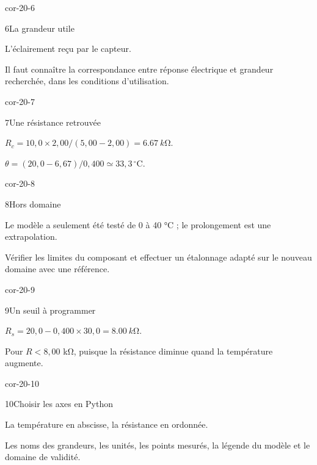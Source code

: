 \begin{blocLivre}{cor-20-6}\begin{corrige}{6}{La grandeur utile}
\begin{questions}
\item L’éclairement reçu par le capteur.
\item Il faut connaître la correspondance entre réponse électrique et grandeur recherchée, dans les conditions d’utilisation.
\end{questions}
\end{corrige}\end{blocLivre}
\begin{blocLivre}{cor-20-7}\begin{corrige}{7}{Une résistance retrouvée}
\begin{questions}
\item $R_c=10,0\times2,00/(5,00-2,00)=\qty{6,67}{k\ohm}$.
\item $\theta=(20,0-6,67)/0,400\simeq33,3\,^{\circ}\mathrm C$.
\end{questions}
\end{corrige}\end{blocLivre}
\begin{blocLivre}{cor-20-8}\begin{corrige}{8}{Hors domaine}
\begin{questions}
\item Le modèle a seulement été testé de 0 à 40 °C ; le prolongement est une extrapolation.
\item Vérifier les limites du composant et effectuer un étalonnage adapté sur le nouveau domaine avec une référence.
\end{questions}
\end{corrige}\end{blocLivre}
\begin{blocLivre}{cor-20-9}\begin{corrige}{9}{Un seuil à programmer}
\begin{questions}
\item $R_s=20,0-0,400\times30,0=\qty{8,00}{k\ohm}$.
\item Pour $R<8,00$ kΩ, puisque la résistance diminue quand la température augmente.
\end{questions}
\end{corrige}\end{blocLivre}
\begin{blocLivre}{cor-20-10}\begin{corrige}{10}{Choisir les axes en Python}
\begin{questions}
\item La température en abscisse, la résistance en ordonnée.
\item Les noms des grandeurs, les unités, les points mesurés, la légende du modèle et le domaine de validité.
\end{questions}
\end{corrige}\end{blocLivre}
